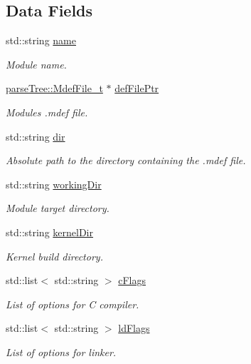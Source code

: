 \subsection*{Data Fields}
\begin{DoxyCompactItemize}
\item 
std\+::string \hyperlink{struct_module__t_ababb92d168b2607d249930f55659793f}{name}
\begin{DoxyCompactList}\small\item\em Module name. \end{DoxyCompactList}\item 
\hyperlink{structparse_tree_1_1_mdef_file__t}{parse\+Tree\+::\+Mdef\+File\+\_\+t} $\ast$ \hyperlink{struct_module__t_a0a0295117c585f8a8b8aef6b5cb29943}{def\+File\+Ptr}
\begin{DoxyCompactList}\small\item\em Module\textquotesingle{}s .mdef file. \end{DoxyCompactList}\item 
std\+::string \hyperlink{struct_module__t_a6c289cc21b1976483d35179bb073da74}{dir}
\begin{DoxyCompactList}\small\item\em Absolute path to the directory containing the .mdef file. \end{DoxyCompactList}\item 
std\+::string \hyperlink{struct_module__t_aba486a8cf8b76fe4f120ab2665cf81e0}{working\+Dir}
\begin{DoxyCompactList}\small\item\em Module target directory. \end{DoxyCompactList}\item 
std\+::string \hyperlink{struct_module__t_ac3d6729a9fe952e0aea50be738ac9139}{kernel\+Dir}
\begin{DoxyCompactList}\small\item\em Kernel build directory. \end{DoxyCompactList}\item 
std\+::list$<$ std\+::string $>$ \hyperlink{struct_module__t_a6b5e2ce435023523cc589d78805a2922}{c\+Flags}
\begin{DoxyCompactList}\small\item\em List of options for C compiler. \end{DoxyCompactList}\item 
std\+::list$<$ std\+::string $>$ \hyperlink{struct_module__t_a3a252c5a12ba80aeb9036efb0672a3dd}{ld\+Flags}
\begin{DoxyCompactList}\small\item\em List of options for linker. \end{DoxyCompactList}\item 

\end{DoxyCompactItemize}
